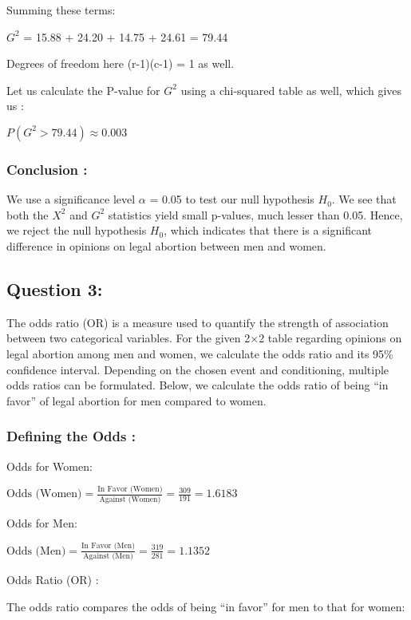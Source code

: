 \documentclass[
]{article}
\begin{document}
Summing these terms:

\({G^2}\) = 15.88 + 24.20 + 14.75 + 24.61 = 79.44

Degrees of freedom here (r-1)(c-1) = 1 as well.

Let us calculate the P-value for \({G^2}\) using a chi-squared table as
well, which gives us :

\({P(G^2 > 79.44) \approx 0.003}\)

\subsubsection{Conclusion :}\label{conclusion}

We use a significance level \({\alpha}\) = 0.05 to test our null
hypothesis \({H_0}\). We see that both the \({X^2}\) and \({G^2}\)
statistics yield small p-values, much lesser than 0.05. Hence, we reject
the null hypothesis \({H_0}\), which indicates that there is a
significant difference in opinions on legal abortion between men and
women.

\subsection{Question 3:}\label{question-3}

The odds ratio (OR) is a measure used to quantify the strength of
association between two categorical variables. For the given 2×2 table
regarding opinions on legal abortion among men and women, we calculate
the odds ratio and its 95\% confidence interval. Depending on the chosen
event and conditioning, multiple odds ratios can be formulated. Below,
we calculate the odds ratio of being ``in favor'' of legal abortion for
men compared to women.

\subsubsection{Defining the Odds :}\label{defining-the-odds}

Odds for Women:

\({\text{Odds (Women)} = \frac{\text{In Favor (Women)}}{\text{Against (Women)}} = \frac{309}{191} = 1.6183}\)

Odds for Men:

\({\text{Odds (Men)} = \frac{\text{In Favor (Men)}}{\text{Against (Men)}} = \frac{319}{281} = 1.1352}\)

Odds Ratio (OR) :

The odds ratio compares the odds of being ``in favor'' for men to that
for women:
\end{document}
